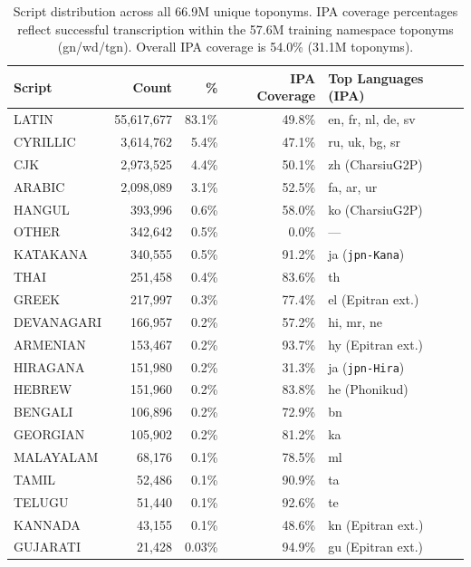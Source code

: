 \documentclass[11pt,a4paper]{article}
\begin{document}
\begin{table}[p]
\centering
\small
\begin{tabular}{lrrrl}
\toprule
\textbf{Script} & \textbf{Count} & \textbf{\%} & \textbf{IPA Coverage} & \textbf{Top Languages (IPA)} \\
\midrule
LATIN & 55,617,677 & 83.1\% & 49.8\% & en, fr, nl, de, sv \\
CYRILLIC & 3,614,762 & 5.4\% & 47.1\% & ru, uk, bg, sr \\
CJK & 2,973,525 & 4.4\% & 50.1\% & zh (CharsiuG2P) \\
ARABIC & 2,098,089 & 3.1\% & 52.5\% & fa, ar, ur \\
HANGUL & 393,996 & 0.6\% & 58.0\% & ko (CharsiuG2P) \\
OTHER & 342,642 & 0.5\% & 0.0\% & --- \\
KATAKANA & 340,555 & 0.5\% & 91.2\% & ja (\texttt{jpn-Kana}) \\
THAI & 251,458 & 0.4\% & 83.6\% & th \\
GREEK & 217,997 & 0.3\% & 77.4\% & el (Epitran ext.) \\
DEVANAGARI & 166,957 & 0.2\% & 57.2\% & hi, mr, ne \\
ARMENIAN & 153,467 & 0.2\% & 93.7\% & hy (Epitran ext.) \\
HIRAGANA & 151,980 & 0.2\% & 31.3\% & ja (\texttt{jpn-Hira}) \\
HEBREW & 151,960 & 0.2\% & 83.8\% & he (Phonikud) \\
BENGALI & 106,896 & 0.2\% & 72.9\% & bn \\
GEORGIAN & 105,902 & 0.2\% & 81.2\% & ka \\
MALAYALAM & 68,176 & 0.1\% & 78.5\% & ml \\
TAMIL & 52,486 & 0.1\% & 90.9\% & ta \\
TELUGU & 51,440 & 0.1\% & 92.6\% & te \\
KANNADA & 43,155 & 0.1\% & 48.6\% & kn (Epitran ext.) \\
GUJARATI & 21,428 & 0.03\% & 94.9\% & gu (Epitran ext.) \\
\bottomrule
\end{tabular}
\caption{Script distribution across all 66.9M unique toponyms. IPA coverage percentages reflect successful transcription within the 57.6M training namespace toponyms (gn/wd/tgn). Overall IPA coverage is 54.0\% (31.1M toponyms).}
\label{tab:script-distribution}
\end{table}

\clearpage
\end{document}
